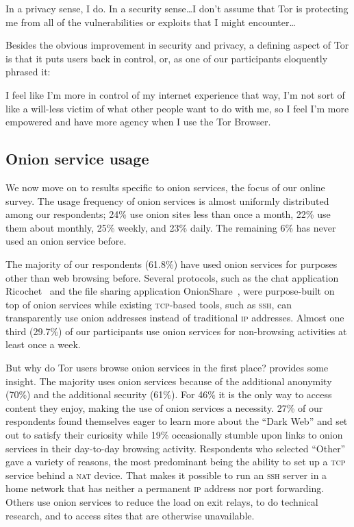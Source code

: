 \begin{displayquote}[P06]
In a privacy sense, I do. In a security sense\ldots I don't assume that Tor is
protecting me from all of the vulnerabilities or exploits that I might
encounter\ldots
\end{displayquote}

Besides the obvious improvement in security and privacy, a defining aspect of
Tor is that it puts users back in control, or, as one of our participants
eloquently phrased it:

\begin{displayquote}[P02]
I feel like I'm more in control of my internet experience that way, I'm not sort
of like a will-less victim of what other people want to do with me, so I feel
I'm more empowered and have more agency when I use the Tor Browser.
\end{displayquote}

\subsection{Onion service usage}

We now move on to results specific to onion services, the focus of our online
survey.  The usage frequency of onion services is almost uniformly distributed
among our respondents; 24\% use onion sites less than once a month, 22\% use
them about monthly, 25\% weekly, and 23\% daily.  The remaining 6\% has never
used an onion service before.

The majority of our respondents (61.8\%) have used onion services for purposes
other than web browsing before.  Several protocols, such as the chat application
Ricochet~\cite{ricochet} and the file sharing application
OnionShare~\cite{onionshare}, were purpose-built on top of onion services while
existing \textsc{tcp}-based tools, such as \textsc{ssh}, can transparently use
onion addresses instead of traditional \textsc{ip} addresses.  Almost one third
(29.7\%) of our participants use onion services for non-browsing activities at
least once a week.

But why do Tor users browse onion services in the first place?
 provides some insight.  The majority uses onion services
because of the additional anonymity (70\%) and the additional security (61\%).
For 46\% it is the only way to access content they enjoy, making the use of
onion services a necessity.  27\% of our respondents found themselves eager to
learn more about the ``Dark Web'' and set out to satisfy their curiosity while
19\% occasionally stumble upon links to onion services in their day-to-day
browsing activity.  Respondents who selected ``Other'' gave a variety of
reasons, the most predominant being the ability to set up a \textsc{tcp} service
behind a \textsc{nat} device.  That makes it possible to run an \textsc{ssh}
server in a home network that has neither a permanent \textsc{ip} address nor
port forwarding.  Others use onion services to reduce the load on exit relays,
to do technical research, and to access sites that are otherwise unavailable.

